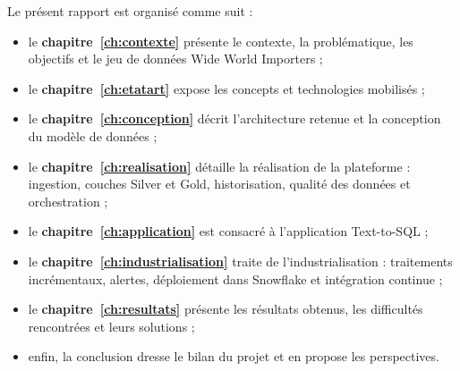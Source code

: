 Le présent rapport est organisé comme suit :
\begin{itemize}
  \item le \textbf{chapitre~\ref{ch:contexte}} présente le contexte, la problématique, les objectifs et le
        jeu de données Wide World Importers ;
  \item le \textbf{chapitre~\ref{ch:etatart}} expose les concepts et technologies mobilisés ;
  \item le \textbf{chapitre~\ref{ch:conception}} décrit l'architecture retenue et la conception du modèle
        de données ;
  \item le \textbf{chapitre~\ref{ch:realisation}} détaille la réalisation de la plateforme : ingestion,
        couches Silver et Gold, historisation, qualité des données et orchestration ;
  \item le \textbf{chapitre~\ref{ch:application}} est consacré à l'application Text-to-SQL ;
  \item le \textbf{chapitre~\ref{ch:industrialisation}} traite de l'industrialisation : traitements
        incrémentaux, alertes, déploiement dans Snowflake et intégration continue ;
  \item le \textbf{chapitre~\ref{ch:resultats}} présente les résultats obtenus, les difficultés
        rencontrées et leurs solutions ;
  \item enfin, la conclusion dresse le bilan du projet et en propose les perspectives.
\end{itemize}
